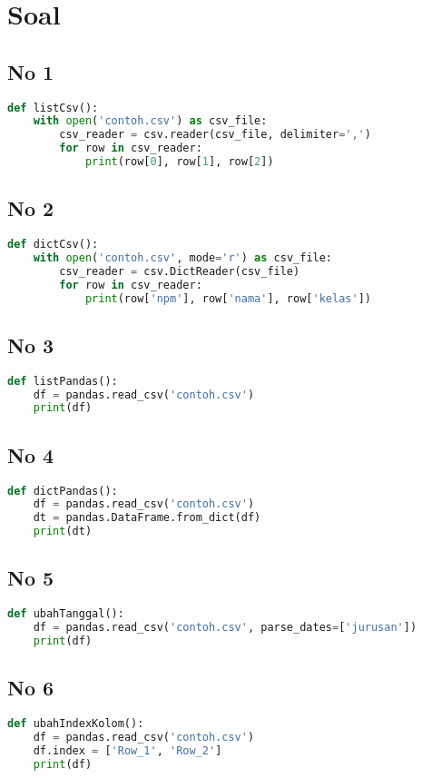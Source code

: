 \chapter{Soal}
\section*{No 1}
\begin{lstlisting}[language=Python]
def listCsv():
    with open('contoh.csv') as csv_file:
        csv_reader = csv.reader(csv_file, delimiter=',')
        for row in csv_reader:
            print(row[0], row[1], row[2])
\end{lstlisting}
\section*{No 2}
\begin{lstlisting}[language=Python]
def dictCsv():
    with open('contoh.csv', mode='r') as csv_file:
        csv_reader = csv.DictReader(csv_file)
        for row in csv_reader:
            print(row['npm'], row['nama'], row['kelas'])

\end{lstlisting}
\section*{No 3}
\begin{lstlisting}[language=Python]
def listPandas():
    df = pandas.read_csv('contoh.csv')
    print(df)
\end{lstlisting}
\section*{No 4}
\begin{lstlisting}[language=Python]
def dictPandas():
    df = pandas.read_csv('contoh.csv')
    dt = pandas.DataFrame.from_dict(df)
    print(dt)
\end{lstlisting}
\section*{No 5}
\begin{lstlisting}[language=Python]
def ubahTanggal():
    df = pandas.read_csv('contoh.csv', parse_dates=['jurusan'])
    print(df)
\end{lstlisting}
\section*{No 6}
\begin{lstlisting}[language=Python]
def ubahIndexKolom():
    df = pandas.read_csv('contoh.csv')
    df.index = ['Row_1', 'Row_2']
    print(df)

\end{lstlisting}
